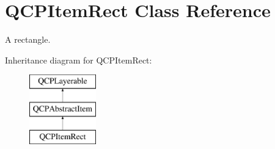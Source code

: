 \hypertarget{classQCPItemRect}{\section{\-Q\-C\-P\-Item\-Rect \-Class \-Reference}
\label{classQCPItemRect}
}


\-A rectangle.  


\-Inheritance diagram for \-Q\-C\-P\-Item\-Rect\-:\begin{figure}[H]
\begin{center}
\leavevmode
\includegraphics[height=3.000000cm]{classQCPItemRect}
\end{center}
\end{figure}
